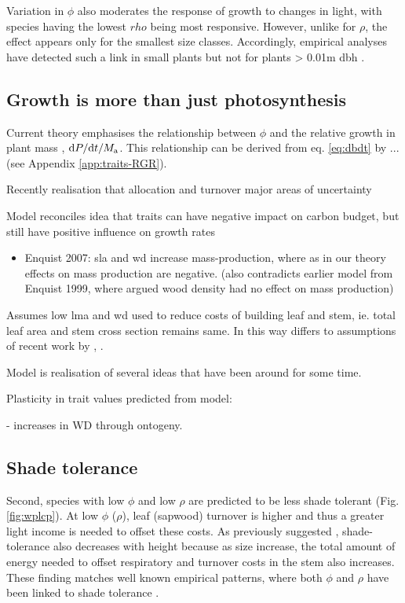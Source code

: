 \documentclass[a4paper,11pt]{article}
\begin{document}
Variation in $\phi$ also moderates the response of growth to changes
in light, with species having the lowest $rho$ being most responsive.
However, unlike for $\rho$, the effect appears only for the smallest
size classes. Accordingly, empirical analyses have detected such a link
in small plants but not for plants \textgreater{} 0.01m
dbh \citep{Ruger-2012}.

\subsection{Growth is more than just photosynthesis}

Current theory emphasises the relationship between $\phi$ and the relative growth in plant mass
\citep{Lambers-1992, Cornelissen-1996, Wright-2000, Enquist-2007},
${\rm d}P / {\rm d}t / M_{\rm a}$. This relationship can be derived from eq. \ref{eq:dbdt}  by ...
(see Appendix \ref{app:traits-RGR}).

Recently realisation that allocation and turnover major areas of
uncertainty

Model reconciles idea that traits can have negative impact on carbon
budget, but still have positive influence on growth rates

\begin{itemize}
\itemsep1pt\parskip0pt
\item
  Enquist 2007: sla and wd increase mass-production, where as in our
  theory effects on mass production are negative. (also contradicts
  earlier model from Enquist 1999, where argued wood density had no
  effect on mass production)
\end{itemize}

Assumes low lma and wd used to reduce costs of building leaf and stem,
ie. total leaf area and stem cross section remains same. In this way
differs to assumptions of recent work by \citep{Anten-2010}, \citep{Larjavaara-2010}.

Model is realisation of several ideas that have been around for some
time.

Plasticity in trait values predicted from model:

\citep{Osazuwa-2014} - increases in WD through ontogeny.

\subsection{Shade tolerance}

Second, species with low $\phi$ and low $\rho$ are predicted to be
less shade tolerant (Fig. \ref{fig:wplcp}). At low $\phi$ ($\rho$),
leaf (sapwood) turnover is higher and thus a greater light income is
needed to offset these costs. As previously suggested
 \citep{Givnish-1988}, shade-tolerance also decreases with
height because as size increase, the total amount of energy needed to
offset respiratory and turnover costs in the stem also increases. These
finding matches well known empirical patterns, where both $\phi$ and
$\rho$ have been linked to shade tolerance \citep{Poorter-2006, Lusk-2008,Osunkoya-1996}.
\end{document}
